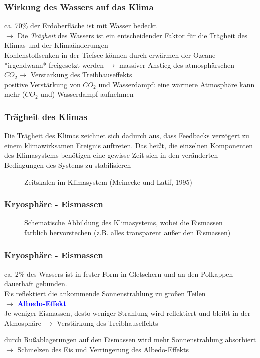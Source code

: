 \begin{frame}
	\frametitle{Wirkung des Wassers auf das Klima}
	ca. 70\% der Erdoberfläche ist mit Wasser bedeckt\\
	$\rightarrow$ Die \textit{Trägheit} des Wassers ist ein entscheidender Faktor für die Trägheit des Klimas und der Klimaänderungen \\%
	Kohlenstoffsenken in der Tiefsee können durch erwärmen der Ozeane *irgendwann* freigesetzt werden $\rightarrow$ massiver Anstieg des atmosphärschen $CO_2 \rightarrow$ Verstarkung des Treibhauseffekts\\
	positive Verstärkung von $CO_2$ und Wasserdampf: eine wärmere Atmosphäre kann mehr ($CO_2$ und) Wasserdampf aufnehmen
\end{frame}

\begin{frame}
	\frametitle{Trägheit des Klimas}
	Die Trägheit des Klimas zeichnet sich dadurch aus, dass Feedbacks verzögert zu einem klimawirksamen Ereignis auftreten. Das heißt, die einzelnen Komponenten des Klimasystems benötigen eine gewisse Zeit sich in den veränderten Bedingungen des Systems zu stabilisieren
	
	
	\begin{figure}
		\caption{Zeitskalen im Klimasystem (Meinecke und Latif, 1995)}
	\end{figure}
\end{frame}

\begin{frame}
	\frametitle{Kryosphäre - Eismassen}
	
	\begin{figure}
		\caption{Schematische Abbildung des Klimasystems, wobei die Eismassen farblich hervorstechen (z.B. alles transparent außer den Eismassen)}
	\end{figure}
\end{frame}

\begin{frame}
	\frametitle{Kryosphäre - Eismassen} %
	ca. 2\% des Wassers ist in fester Form in Gletschern und an den Polkappen dauerhaft gebunden. \\
	Eis reflektiert die ankommende Sonnenstrahlung zu großen Teilen\\
	$\rightarrow$ \textbf{\textcolor{blue}{Albedo-Effekt}}\\
	
	Je weniger Eismassen, desto weniger Strahlung wird reflektiert und bleibt in der Atmosphäre $\rightarrow$ Verstärkung des Treibhauseffekts
	
	durch Rußablagerungen auf den Eismassen wird mehr Sonnenstrahlung absorbiert $\rightarrow$ Schmelzen des Eis und Verringerung des Albedo-Effekts %
	
\end{frame}

